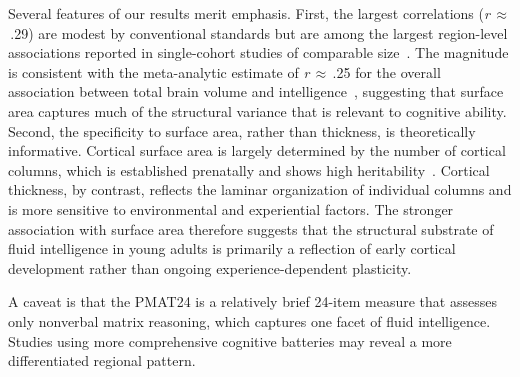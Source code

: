 Several features of our results merit emphasis.
First, the largest correlations (\textit{r}\,$\approx$\,.29) are modest by conventional standards but are among the largest region-level associations reported in single-cohort studies of comparable size~\cite{pietschnig2015meta}.
The magnitude is consistent with the meta-analytic estimate of \textit{r}\,$\approx$\,.25 for the overall association between total brain volume and intelligence~\cite{pietschnig2015meta}, suggesting that surface area captures much of the structural variance that is relevant to cognitive ability.
Second, the specificity to surface area, rather than thickness, is theoretically informative.
Cortical surface area is largely determined by the number of cortical columns, which is established prenatally and shows high heritability~\cite{grasby2020genetic}.
Cortical thickness, by contrast, reflects the laminar organization of individual columns and is more sensitive to environmental and experiential factors.
The stronger association with surface area therefore suggests that the structural substrate of fluid intelligence in young adults is primarily a reflection of early cortical development rather than ongoing experience-dependent plasticity.

A caveat is that the PMAT24 is a relatively brief 24-item measure that assesses only nonverbal matrix reasoning, which captures one facet of fluid intelligence.
Studies using more comprehensive cognitive batteries may reveal a more differentiated regional pattern.
